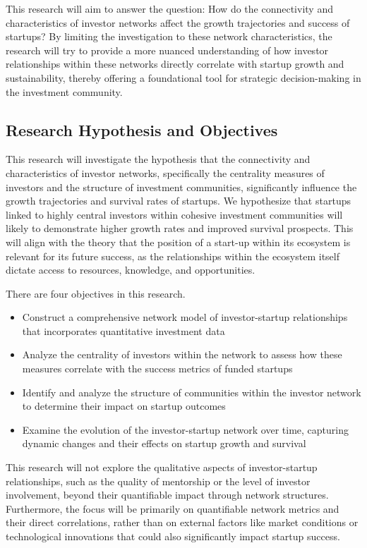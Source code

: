 \documentclass[a4paper,11pt]{article}
\begin{document}
This research will aim to answer the question: How do the connectivity and characteristics of investor networks affect the growth trajectories and success of startups? By limiting the investigation to these network characteristics, the research will try to provide a more nuanced understanding of how investor relationships within these networks directly correlate with startup growth and sustainability, thereby offering a foundational tool for strategic decision-making in the investment community.

\subsection{Research Hypothesis and Objectives}
This research will investigate the hypothesis that the connectivity and characteristics of investor networks, specifically the centrality measures of investors and the structure of investment communities, significantly influence the growth trajectories and survival rates of startups. We hypothesize that startups linked to highly central investors within cohesive investment communities will likely to demonstrate higher growth rates and improved survival prospects. This will align with the theory that the position of a start-up within its ecosystem is relevant for its future success, as the relationships within the ecosystem itself dictate access to resources, knowledge, and opportunities.

There are four objectives in this research. 
\begin{itemize}
    \item Construct a comprehensive network model of investor-startup relationships that incorporates quantitative investment data
    \item Analyze the centrality of investors within the network to assess how these measures correlate with the success metrics of funded startups
    \item Identify and analyze the structure of communities within the investor network to determine their impact on startup outcomes
    \item Examine the evolution of the investor-startup network over time, capturing dynamic changes and their effects on startup growth and survival
\end{itemize}

This research will not explore the qualitative aspects of investor-startup relationships, such as the quality of mentorship or the level of investor involvement, beyond their quantifiable impact through network structures. Furthermore, the focus will be primarily on quantifiable network metrics and their direct correlations, rather than on external factors like market conditions or technological innovations that could also significantly impact startup success.
\end{document}
